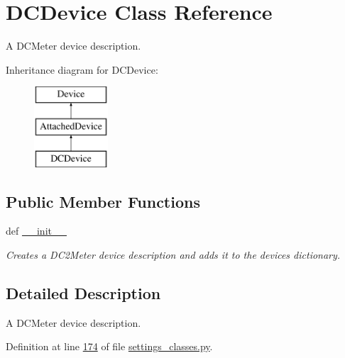 \hypertarget{classsettings__classes_1_1_d_c_device}{\section{\-D\-C\-Device \-Class \-Reference}
\label{classsettings__classes_1_1_d_c_device}
}


\-A \-D\-C\-Meter device description.  


\-Inheritance diagram for \-D\-C\-Device\-:\begin{figure}[H]
\begin{center}
\leavevmode
\includegraphics[height=3.000000cm]{classsettings__classes_1_1_d_c_device}
\end{center}
\end{figure}
\subsection*{\-Public \-Member \-Functions}
\begin{DoxyCompactItemize}
\item 
def \hyperlink{classsettings__classes_1_1_d_c_device_ac775ee34451fdfa742b318538164070e}{\-\_\-\-\_\-init\-\_\-\-\_\-}
\begin{DoxyCompactList}\small\item\em \-Creates a \-D\-C2\-Meter device description and adds it to the devices dictionary. \end{DoxyCompactList}\end{DoxyCompactItemize}


\subsection{\-Detailed \-Description}
\-A \-D\-C\-Meter device description. 

\-Definition at line \hyperlink{settings__classes_8py_source_l00174}{174} of file \hyperlink{settings__classes_8py_source}{settings\-\_\-classes.\-py}.



